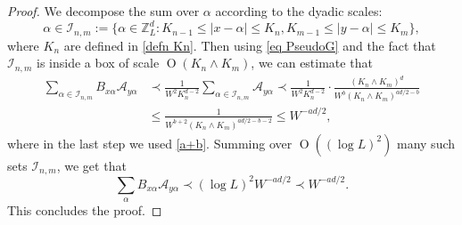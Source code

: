 \documentclass{article}
\newcommand{\1}{\mathds{1}}
\numberwithin{equation}{section}
\newcommand{\al}{\alpha}
\newcommand{\be}{\begin{equation}}
\newcommand{\ee}{\end{equation}}
\newcommand{\e}{{\varepsilon}}
\renewcommand{\cal}{\mathcal}
\newcommand{\wt}{\widetilde}
\renewcommand{\leq}{\leqslant}
\renewcommand{\geq}{\geqslant}
\renewcommand{\le}{\leq}
\renewcommand{\ge}{\geq}
\newcommand{\Z}{\mathbb{Z}}
\DeclareMathOperator{\OO}{O}
\theoremstyle{plain} %
\theoremstyle{remark}
\begin{document}
\begin{proof}
We decompose the sum over $\al$ according to the dyadic scales: 
$$\al\in \cal I_{n,m}:=\{\al\in \Z_L^d: K_{n-1} \le |x-\al| \le K_{n},K_{m-1} \le |y-\al| \le K_{m}\},$$ 
where $K_n$ are defined in \eqref{defn Kn}. Then using \eqref{eq PseudoG} and the fact that $\cal I_{n,m}$ is inside a box of scale $\OO(K_{n}\wedge K_{m})$, we can estimate that %
\begin{align*}
\sum_{\al\in \cal I_{n,m}}B_{x\al} \cal A_{y\al} &\prec \frac{1}{W^2K_n^{d-2}}\sum_{\al\in \cal I_{n,m}}\cal A_{y\al}  \prec   \frac1{W^{2} K_{n}^{d-2} }\cdot \frac{\left( K_n\wedge K_m\right)^{d}}{ W^b(K_n\wedge K_m)^{ad/2-b}}  \\
&\le  \frac{1}{ W^{b+2}(K_n\wedge K_m)^{ad/2-b-2}}  \le  W^{-a d/2},
\end{align*}
where in the last step we used \eqref{a+b}. Summing over $\OO( (\log L)^2)$ many such sets $\cal I_{n,m}$, we get that 
$$\sum_{ \al }B_{x\al} \cal A_{y\al} \prec (\log L)^2  W^{-a d/2}\prec W^{-a d/2}.$$
This concludes the proof.
\end{proof}
\end{document}
